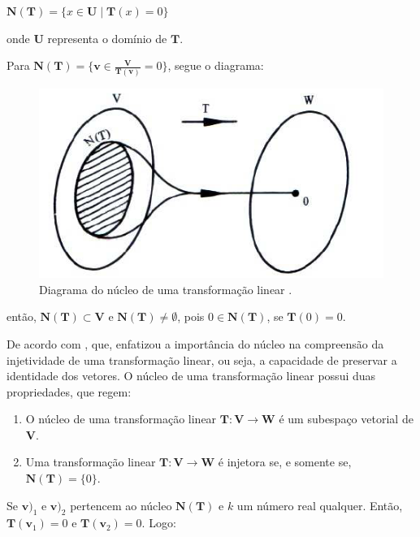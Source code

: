 \centerline{$\mathbf{N}(\mathbf{T}) = \{x \in \mathbf{U} \mid \mathbf{T}(x) = 0\}$}

\noindent onde $\mathbf{U}$ representa o domínio de $\mathbf{T}$.

Para $\mathbf{N}(\mathbf{T}) = \{\mathbf{v} \in \frac{\mathbf{V}}{\mathbf{T}(\mathbf{v})} = 0\}$, segue o diagrama:

\begin{figure}[H]
	\centering
	\includegraphics[scale=1.00]{t_nucleo.png}
	\caption{Diagrama do núcleo de uma transformação linear \cite{steinbruch1987}.}
\end{figure}

\noindent então, $\mathbf{N}(\mathbf{T}) \subset \mathbf{V}$ e $\mathbf{N}(\mathbf{T}) \neq \emptyset$, pois $0 \in \mathbf{N}(\mathbf{T})$, se $\mathbf{T}(0) = 0$.

De acordo com \cite{lang2003}, que, enfatizou a importância do núcleo na compreensão da injetividade de uma transformação linear, ou seja, a capacidade de preservar a identidade dos vetores. O núcleo de uma transformação linear possui duas propriedades, que regem:

\begin{enumerate}
	\item O núcleo de uma transformação linear $\mathbf{T}: \mathbf{V} \longrightarrow \mathbf{W}$ é um subespaço vetorial de $\mathbf{V}$.
	\item Uma transformação linear $\mathbf{T}: \mathbf{V} \longrightarrow \mathbf{W}$ é injetora se, e somente se, $\mathbf{N}(\mathbf{T}) = \{0\}$.
\end{enumerate}

Se $\mathbf{v)}_1$ e $\mathbf{v)}_2$ pertencem ao núcleo $\mathbf{N}(\mathbf{T})$ e $k$ um número real qualquer. Então, $\mathbf{T}(\mathbf{v}_1) = 0$ e $\mathbf{T}(\mathbf{v}_2) = 0$. Logo:

